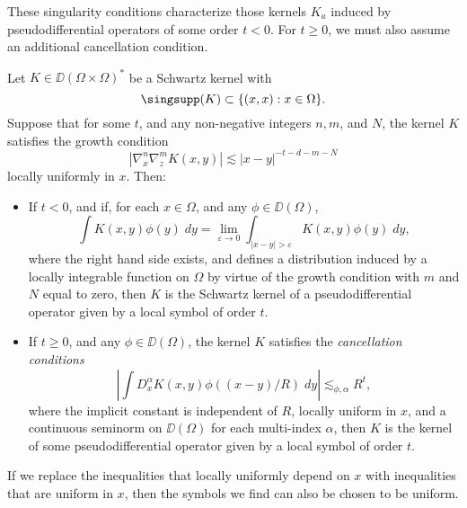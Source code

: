 These singularity conditions characterize those kernels $K_a$ induced by pseudodifferential operators of some order $t < 0$. For $t \geq 0$, we must also assume an additional cancellation condition.

\begin{lemma}
    Let $K \in \DD(\Omega \times \Omega)^*$ be a Schwartz kernel with
    \[ \singsupp(K) \subset \{ (x,x): x \in \Omega \}. \]
    Suppose that for some $t$, and any non-negative integers $n,m$, and $N$, the kernel $K$ satisfies the growth condition
    \[ |\nabla^n_x \nabla^m_z K(x,y)| \lesssim |x-y|^{-t-d-m-N} \]
    locally uniformly in $x$. Then:
    \begin{itemize}
        \item If $t < 0$, and if, for each $x \in \Omega$, and any $\phi \in \DD(\Omega)$,
        \[ \int K(x,y) \phi(y)\; dy = \lim_{\varepsilon \to 0} \int_{|x-y| > \varepsilon} K(x,y) \phi(y)\; dy, \]
        where the right hand side exists, and defines a distribution induced by a locally integrable function on $\Omega$ by virtue of the growth condition with $m$ and $N$ equal to zero, then $K$ is the Schwartz kernel of a pseudodifferential operator given by a local symbol of order $t$.

        \item If $t \geq 0$, and any $\phi \in \DD(\Omega)$, the kernel $K$ satisfies the \emph{cancellation conditions}
        \[ \left| \int D^\alpha_x K(x,y) \phi((x-y)/R)\; dy \right| \lesssim_{\phi,\alpha} R^t, \]
        where the implicit constant is independent of $R$, locally uniform in $x$, and a continuous seminorm on $\DD(\Omega)$ for each multi-index $\alpha$, then $K$ is the kernel of some pseudodifferential operator given by a local symbol of order $t$.
    \end{itemize}
    If we replace the inequalities that locally uniformly depend on $x$ with inequalities that are uniform in $x$, then the symbols we find can also be chosen to be uniform.
\end{lemma}
